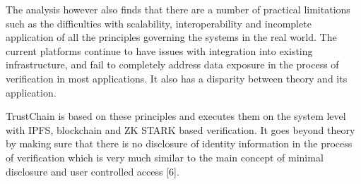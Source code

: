 The analysis however also finds that there are a number of practical limitations such as the difficulties with scalability, interoperability and incomplete application of all the principles governing the systems in the real world. The current platforms continue to have issues with integration into existing infrastructure, and fail to completely address data exposure in the process of verification in most applications. It also has a disparity between theory and its application.

TrustChain is based on these principles and executes them on the system level with IPFS, blockchain and ZK STARK based verification. It goes beyond theory by making sure that there is no disclosure of identity information in the process of verification which is very much similar to the main concept of minimal disclosure and user controlled access [6].\\







